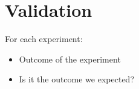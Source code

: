 \chapter{Validation}
For each experiment:
\begin{itemize}
    \item Outcome of the experiment
    \item Is it the outcome we expected?
\end{itemize}